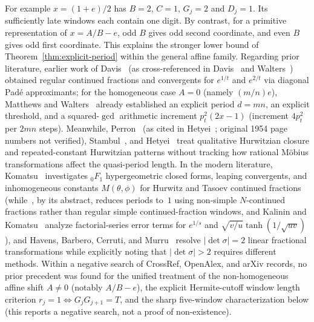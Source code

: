 \documentclass[11pt]{amsart}
\theoremstyle{definition}
\theoremstyle{remark}
\numberwithin{equation}{section}
\begin{document}
For example $x=(1+e)/2$ has $B=2$, $C=1$, $G_j=2$ and $D_j=1$.
Its sufficiently late windows each contain one digit. By contrast,
for a primitive representation of $x=A/B-e$, odd $B$ gives odd
second coordinate, and even $B$ gives odd first coordinate. This
explains the stronger lower bound of Theorem~\ref{thm:explicit-period}
within the general affine family. Regarding prior literature,
earlier work of Davis~\cite{Davis1945} (as cross-referenced in
Davis~\cite{Davis1978} and Walters~\cite{Walters1968}) obtained regular
continued fractions and convergents for $e^{1/t}$ and $e^{2/t}$ via
diagonal Pad\'e approximants; for the homogeneous case $A=0$ (namely
$(m/n)e$), Matthews and Walters~\cite[Theorem~1(b)]{MatthewsWalters1970}
already established an explicit period $d=mn$, an explicit threshold,
and a squared-$\gcd$ arithmetic increment $p_t^2(2x-1)$ (increment
$4p_t^2$ per $2mn$ steps). Meanwhile, Perron~\cite[Band~I, \S33]{Perron1954}
(as cited in Hetyei~\cite[\S1.2, p.~4]{Hetyei2014}; original 1954 page
numbers not verified), Stambul~\cite{Stambul}, and
Hetyei~\cite{Hetyei2014} treat qualitative Hurwitzian closure and
repeated-constant Hurwitzian patterns without tracking how rational
M\"obius transformations affect the quasi-period length. In the modern
literature, Komatsu~\cite{Komatsu1999JTNB,Komatsu2003Tsukuba,Komatsu2007Czech,Komatsu2008Sarajevo}
investigates ${}_0F_1$ hypergeometric closed forms, leaping convergents,
and inhomogeneous constants $M(\theta,\phi)$ for Hurwitz and Tasoev
continued fractions (while~\cite{Komatsu2009JNT}, by its abstract,
reduces periods to~$1$ using non-simple $N$-continued fractions rather
than regular simple continued-fraction windows, and Kalinin and
Komatsu~\cite{KalininKomatsu2026} analyze factorial-series error terms
for $e^{1/s}$ and $\sqrt{v/u}\tanh(1/\sqrt{uv})$), and Havens, Barbero,
Cerruti, and Murru~\cite{HBCM2020} resolve $|\det\sigma|=2$ linear
fractional transformations while explicitly noting that $|\det\sigma|>2$
requires different methods. Within a negative search of CrossRef,
OpenAlex, and arXiv records, no prior precedent was found for the
unified treatment of the non-homogeneous affine shift $A\ne0$ (notably
$A/B-e$), the explicit Hermite-cutoff window length criterion
$r_j=1\iff G_jG_{j+1}=T$, and the sharp five-window characterization
below (this reports a negative search, not a proof of non-existence).
\end{document}
